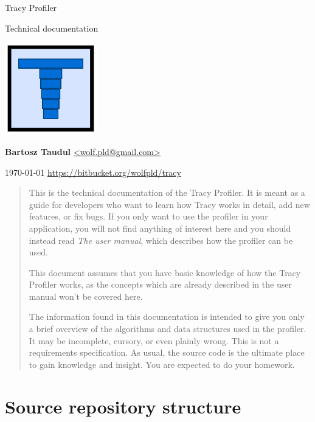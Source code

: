 \documentclass[hidelinks,titlepage,a4paper]{article}
\begin{document}
\begin{titlepage}
\centering
{\fontsize{120}{140}\selectfont Tracy Profiler}

\vspace{50pt} {\Huge{}\selectfont Technical documentation}

\vfill \includegraphics[height=40mm]{../icon/icon}

\vfill
\large\textbf{Bartosz Taudul} \href{mailto:wolf.pld@gmail.com}{<wolf.pld@gmail.com>}

\vspace{10pt}
\today
\vfill
\url{https://bitbucket.org/wolfpld/tracy}
\end{titlepage}

\begin{abstract}
This is the technical documentation of the Tracy Profiler. It is meant as a guide for developers who want to learn how Tracy works in detail, add new features, or fix bugs. If you only want to use the profiler in your application, you will not find anything of interest here and you should instead read \emph{The user manual}, which describes how the profiler can be used.

This document assumes that you have basic knowledge of how the Tracy Profiler works, as the concepts which are already described in the user manual won't be covered here.

The information found in this documentation is intended to give you only a brief overview of the algorithms and data structures used in the profiler. It may be incomplete, cursory, or even plainly wrong. This is not a requirements specification. As usual, the source code is the ultimate place to gain knowledge and insight. You are expected to do your homework.
\end{abstract}

\tableofcontents

\newpage

\section{Source repository structure}
\end{document}

